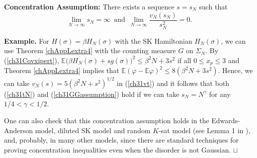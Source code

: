 \documentclass[12pt]{article}
\newcommand{\e}{\mathbb{E}}
\newcommand\qed{\hfill\hbox{\rlap{$\sqcap$}$\sqcup$}}
\theoremstyle{nonumberplain}
\begin{document}
\medskip
\textbf{Concentration Assumption:} There exists a sequence $s= s_N$ such that
\begin{equation}
\lim_{N\to\infty} s_N=\infty
\,\mbox{ and }\,
\lim_{N\to\infty}  \frac{v_N(s_N)}{s_N^{2}} = 0.
\label{ch31GGassumption}
\end{equation}

\medskip
\noindent
\textbf{Example.} For $H(\sigma)=\beta H_N(\sigma)$ with the SK Hamiltonian $H_N(\sigma)$, we can use Theorem \ref{chAppLextra4} with the counting measure $G$ on $\varSigma_N.$ By (\ref{ch31Covxipert}),
$
\e \bigl(\beta H_N(\sigma) + s g(\sigma) \bigr)^2 \leq \beta^2 N + 3s^2
$ 
if all $0\leq x_p \leq 3$ and Theorem \ref{chAppLextra4} implies that $\e (\varphi - \e \varphi)^2 \leq 8 ( \beta^2 N + 3s^2)$. Hence, we can take $v_N(s) = 5 (\beta^2 N + s^2)^{1/2}$ in (\ref{ch31vt}) and it follows that both (\ref{ch31tN}) and (\ref{ch31GGassumption}) hold if we can take $s_N = N^{\gamma}$ for any $1/4<\gamma < 1/2.$

One can also check that this concentration assumption holds in the Edwards-Anderson model, diluted SK model and random $K$-sat model (see Lemma 1 in \cite{HEPS}), and, probably, in many other models, since there are standard techniques for proving concentration inequalities even when the disorder is not Gaussian.
\qed
\end{document}
